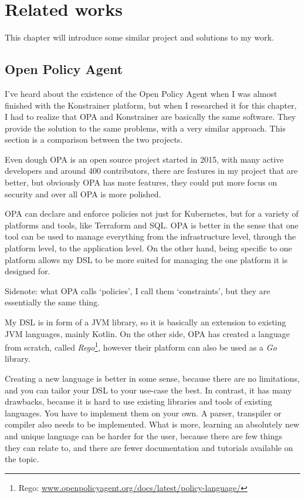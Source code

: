 \setlength{\parindent}{0pt}
\setlength{\parskip}{0.6em}

\chapter{Related works}
\label{chap:relatedWorks}

This chapter will introduce some similar project and solutions to my work.

\section{Open Policy Agent}

I've heard about the existence of the Open Policy Agent when I was almost finished with the Konstrainer platform, but when I researched it for this chapter, I had to realize that OPA and Konstrainer are basically the same software. They provide the solution to the same problems, with a very similar approach. This section is a comparison between the two projects.

Even dough OPA is an open source project started in 2015, with many active developers and around 400 contributors, there are features in my project that are better, but obviously OPA has more features, they could put more focus on security and over all OPA is more polished.

OPA can declare and enforce policies not just for Kubernetes, but for a variety of platforms and tools, like Terraform and SQL. OPA is better in the sense that one tool can be used to manage everything from the infrastructure level, through the platform level, to the application level. On the other hand, being specific to one platform allows my DSL to be more suited for managing the one platform it is designed for.

Sidenote: what OPA calls `policies', I call them `constraints', but they are essentially the same thing.

My DSL is in form of a JVM library, so it is basically an extension to existing JVM languages, mainly Kotlin. On the other side, OPA has created a language from scratch, called \emph{Rego}\footnote{Rego: \url{www.openpolicyagent.org/docs/latest/policy-language/}}, however their platform can also be used as a \emph{Go} library. 

Creating a new language is better in some sense, because there are no limitations, and you can tailor your DSL to your use-case the best. In contrast, it has many drawbacks, because it is hard to use existing libraries and tools of existing languages. You have to implement them on your own. A parser, transpiler or compiler also needs to be implemented. What is more, learning an absolutely new and unique language can be harder for the user, because there are few things they can relate to, and there are fewer documentation and tutorials available on the topic.

